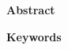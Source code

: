 

%
%
%
%
%
%
%
%
%
%
\clearpage \null 
\vfil 
\begin{center}
	\textbf{Abstract} 
\end{center}

%
%
%
%
%
\vspace{10em} 
\begin{center}
	\textbf{Keywords} \par 
\end{center}

\vfil